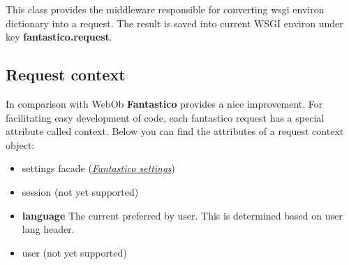 \documentclass[letterpaper,10pt,english]{sphinxmanual}
\begin{document}
\begin{fulllineitems}
\label{features/request_response:fantastico.middleware.request_middleware.RequestMiddleware}
This class provides the middleware responsible for converting wsgi environ dictionary into a request. The result is saved
into current WSGI environ under key \textbf{fantastico.request}.

\end{fulllineitems}



\subsection{Request context}
\label{features/request_response:request-context}
In comparison with WebOb \textbf{Fantastico} provides a nice improvement. For facilitating easy development of code, each fantastico
request has a special attribute called context. Below you can find the attributes of a request context object:
\begin{itemize}
\item {} 
settings facade ({\hyperref[get_started/settings::doc]{\emph{Fantastico settings}}})

\item {} 
session (not yet supported)

\item {} 
\textbf{language} The current preferred by user. This is determined based on user lang header.

\item {} 
user (not yet supported)

\end{itemize}
\end{document}
